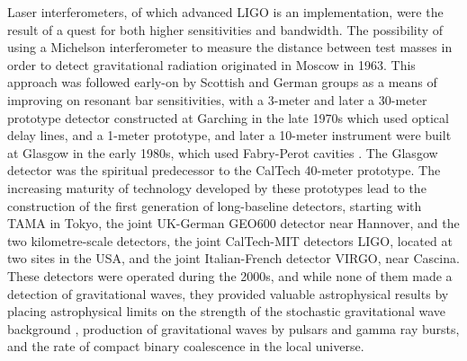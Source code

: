 
Laser interferometers, of which advanced LIGO is an implementation,
were the result of a quest for both higher sensitivities and
bandwidth. The possibility of using a Michelson interferometer to
measure the distance between test masses in order to detect
gravitational radiation originated in Moscow\cite{1963JETP...16..433G}
in 1963.  This approach was followed early-on by Scottish and German
groups as a means of improving on resonant bar sensitivities, with a
3-meter and later a 30-meter prototype detector constructed at
Garching in the late
1970s\cite{1979JPhE...12.1043B,1988PhRvD..38..423S} which used optical
delay lines, and a 1-meter prototype, and later a 10-meter instrument
were built at Glasgow in the early
1980s\cite{1979RSPSA.368...11D,1995RScI...66.4447R}, which used
Fabry-Perot cavities . The Glasgow detector was the spiritual
predecessor to the CalTech 40-meter
prototype\cite{1996PhLA..218..157A}. The increasing maturity of
technology developed by these prototypes lead to the construction of
the first generation of long-baseline detectors, starting with TAMA in
Tokyo\cite{1996JKASS..29..279K}, the joint UK-German GEO600
detector\cite{1997CQGra..14.1471L} near Hannover, and the two
kilometre-scale detectors, the joint CalTech-MIT detectors
LIGO\cite{1992Sci...256..325A}, located at two sites in the USA, and
the joint Italian-French detector VIRGO\cite{1990NIMPA.289..518B},
near Cascina. These detectors were operated during the 2000s, and
while none of them made a detection of gravitational waves, they
provided valuable astrophysical results by placing astrophysical
limits on the strength of the stochastic gravitational wave background
\cite{2014PhRvL.113w1101A}, production of gravitational waves by
pulsars\cite{2014ApJ...785..119A} and gamma ray
bursts\cite{2012ApJ...760...12A}, and the rate of compact binary
coalescence in the local
universe\cite{2012PhRvD..85h2002A,2013PhRvD..87b2002A}.

